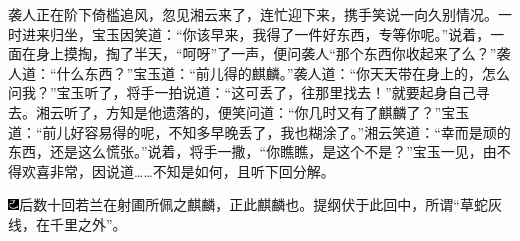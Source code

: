 袭人正在阶下倚槛追风，忽见湘云来了，连忙迎下来，携手笑说一向久别情况。一时进来归坐，宝玉因笑道：“你该早来，我得了一件好东西，专等你呢。”说着，一面在身上摸掏，掏了半天，“呵呀”了一声，便问袭人“那个东西你收起来了么？”袭人道：“什么东西？”宝玉道：“前儿得的麒麟。”袭人道：“你天天带在身上的，怎么问我？”宝玉听了，将手一拍说道：“这可丢了，往那里找去！”就要起身自己寻去。湘云听了，方知是他遗落的，便笑问道：“你几时又有了麒麟了？”宝玉道：“前儿好容易得的呢，不知多早晚丢了，我也糊涂了。”湘云笑道：“幸而是顽的东西，还是这么慌张。”说着，将手一撒，“你瞧瞧，是这个不是？”宝玉一见，由不得欢喜非常，因说道\ldots{}\ldots{}不知是如何，且听下回分解。

{\includegraphics[width=3mm]{../Images/00003}后数十回若兰在射圃所佩之麒麟，正此麒麟也。提纲伏于此回中，所谓“草蛇灰线，在千里之外”。}
